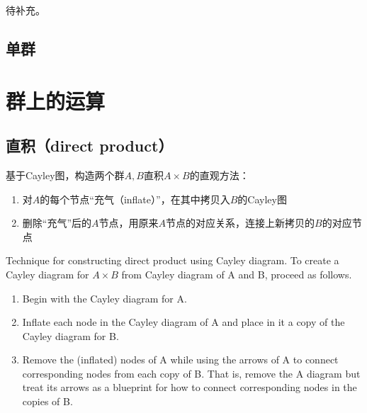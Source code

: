 \documentclass[12pt]{article}
\begin{document}
待补充。

\subsection{单群}

\section{群上的运算}
\subsection{直积（direct product）}
\begin{mdframed}[
linecolor=black!40,outerlinewidth=1pt,roundcorner=.5em,innertopmargin=1ex,innerbottommargin=.5\baselineskip,innerrightmargin=1em,innerleftmargin=1em,backgroundcolor=gray!5,
]
基于Cayley图，构造两个群$A,B$直积$A\times B$的直观方法：
\begin{enumerate}
\setlength{\itemsep}{0pt}
\setlength{\parsep}{0pt}
\setlength{\parskip}{0pt}
	\item 对$A$的每个节点“充气（inflate）”，在其中拷贝入$B$的Cayley图
	\item 删除“充气”后的$A$节点，用原来$A$节点的对应关系，连接上新拷贝的$B$的对应节点
\end{enumerate}

Technique for constructing direct product using Cayley diagram. To create a Cayley diagram for $A \times B$ from Cayley diagram of A and B, proceed as follows.
\begin{enumerate}
\setlength{\itemsep}{0pt}
\setlength{\parsep}{0pt}
\setlength{\parskip}{0pt}
	\item Begin with the Cayley diagram for A.
	\item Inflate each node in the Cayley diagram of A and place in it a copy of the Cayley diagram for B.
	\item Remove the (inflated) nodes of A while using the arrows of A to connect corresponding nodes from each copy of B. That is, remove the A diagram but treat its arrows as a blueprint for how to connect corresponding nodes in the copies of B.
\end{enumerate}
\end{mdframed}
\end{document}
